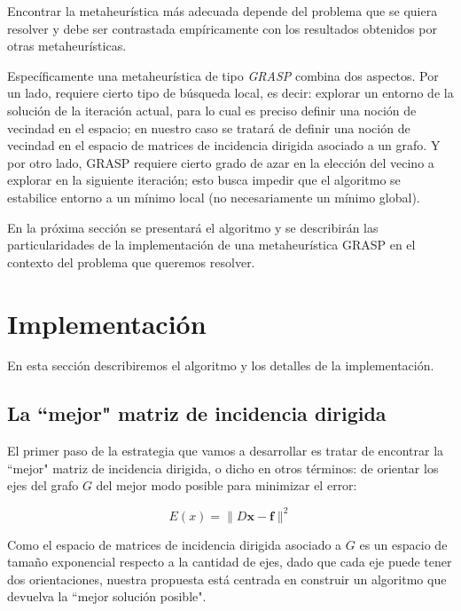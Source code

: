 \documentclass[conference,compsoc,a4paper]{IEEEtran}
\begin{document}
Encontrar la metaheurística más adecuada depende del problema que se 
quiera resolver y debe ser contrastada empíricamente con los resultados 
obtenidos por otras metaheurísticas.

\smallskip

Específicamente una metaheurística de tipo \textit{GRASP} combina dos 
aspectos. Por un lado, requiere cierto tipo de búsqueda local, es decir: 
explorar un entorno de la solución de la iteración actual, para lo cual 
es preciso definir una noción de vecindad en el espacio; en nuestro caso 
se tratará de definir una noción de vecindad en el espacio de matrices 
de incidencia dirigida asociado a un grafo. Y por otro lado, GRASP 
requiere cierto grado de azar en la elección del vecino a explorar en 
la siguiente iteración; esto busca impedir que el algoritmo se 
estabilice entorno a un mínimo local (no necesariamente un mínimo 
global). 

\smallskip

En la próxima sección se presentará el algoritmo y se describirán las 
particularidades de la implementación de una metaheurística GRASP en el 
contexto del problema que queremos resolver.

\section{Implementación}

En esta sección describiremos el algoritmo y los detalles de la 
implementación.

\subsection{La ``mejor" matriz de incidencia dirigida}

El primer paso de la estrategia que vamos a desarrollar es tratar de 
encontrar la ``mejor" matriz de incidencia dirigida, o dicho en otros 
términos: de orientar los ejes del grafo $G$ del mejor modo posible para 
minimizar el error:

$$E(x) = \|D\bm{x}-\bm{f}\|^2$$
 
Como el espacio de matrices de incidencia dirigida asociado a $G$ es un 
espacio de tamaño exponencial respecto a la cantidad de ejes, dado que 
cada eje puede tener dos orientaciones, nuestra propuesta está centrada 
en construir un algoritmo que devuelva la ``mejor solución posible".

\bigskip

\end{document}
